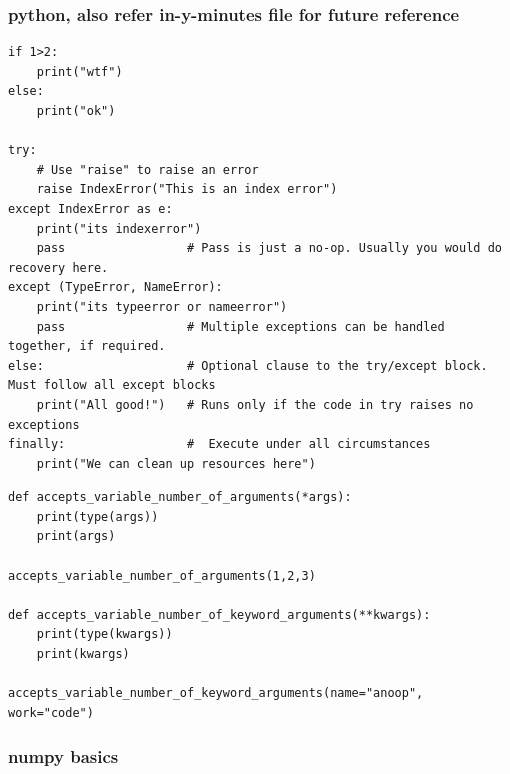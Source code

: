 \documentclass[11pt]{article}
\begin{document}
\subsubsection{python, also refer in-y-minutes file for future reference}
\label{sec:orgd4ef033}
\begin{verbatim}
if 1>2:
    print("wtf")
else:
    print("ok")

try:
    # Use "raise" to raise an error
    raise IndexError("This is an index error")
except IndexError as e:
    print("its indexerror")
    pass                 # Pass is just a no-op. Usually you would do recovery here.
except (TypeError, NameError):
    print("its typeerror or nameerror")
    pass                 # Multiple exceptions can be handled together, if required.
else:                    # Optional clause to the try/except block. Must follow all except blocks
    print("All good!")   # Runs only if the code in try raises no exceptions
finally:                 #  Execute under all circumstances
    print("We can clean up resources here")
\end{verbatim}

\begin{verbatim}
def accepts_variable_number_of_arguments(*args):
    print(type(args))
    print(args)

accepts_variable_number_of_arguments(1,2,3)

def accepts_variable_number_of_keyword_arguments(**kwargs):
    print(type(kwargs))
    print(kwargs)

accepts_variable_number_of_keyword_arguments(name="anoop", work="code")
\end{verbatim}

\subsubsection{numpy basics}
\label{sec:orgbeb06fc}
\end{document}
